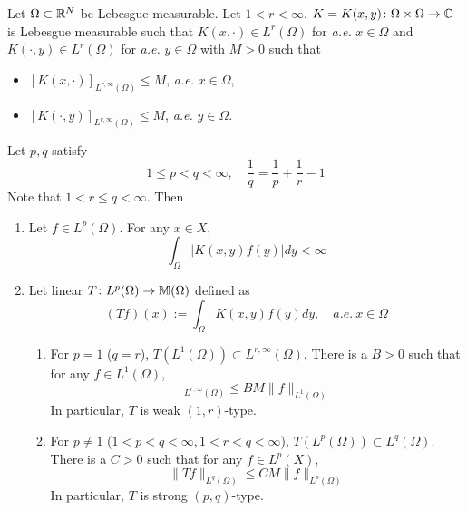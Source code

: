\begin{thm}\label{thm:weakkernel}
	Let $\Omega \subset \mathbb{R}^N$ be Lebesgue measurable. Let $1 < r < \infty$. $K = K(x,y) \colon \Omega \times \Omega \rightarrow \mathbb{C}$ is Lebesgue measurable such that $K(x,\cdot) \in L^r(\Omega)$ for \emph{a.e.} $x \in \Omega$ and $K(\cdot,y) \in L^r(\Omega)$ for \emph{a.e.} $y \in \Omega$ with $M > 0$ such that
	\begin{itemize}
		\item $[K(x, \cdot)]_{L^{r, \infty}(\Omega)} \leq M$, \emph{a.e.} $x\in \Omega$,
		\item $[K(\cdot,y)]_{L^{r, \infty}(\Omega)} \leq M$, \emph{a.e.} $y\in \Omega$.
	\end{itemize}
	Let $p,q$ satisfy
	\begin{equation*}
		1 \leq p<q<\infty, \quad \frac{1}{q}=\frac{1}{p}+\frac{1}{r}-1
	\end{equation*}
	Note that $1<r \leq q<\infty$. Then
	\begin{enumerate}[label=(\arabic{*})]
		\item Let $f \in L^p(\Omega)$. For any $x \in X$,
		\begin{equation*}
			\int_{\Omega}|K(x, y) f(y)| d y<\infty
		\end{equation*}
		\item Let linear $T \colon L^p(\Omega) \rightarrow \mathbb{M}(\Omega)$ defined as
		\begin{equation*}
			(T f)(x):=\int_{\Omega} K(x, y) f(y) d y, \quad  { a.e. }~ x \in \Omega
		\end{equation*}
		\begin{enumerate}[label=(\roman*)]
			\item For $p = 1$ ($q = r$), $T(L^1(\Omega)) \subset L^{r,\infty}(\Omega)$. There is a $B > 0$ such that for any $f \in L^1(\Omega)$,
			\begin{equation*}
				[T f]_{L^{r, \infty}(\Omega)} \leq B M\|f\|_{L^1(\Omega)}
			\end{equation*}
			In particular, $T$ is weak $(1,r)$-type.

			\item For $p \neq 1$ ($1<p<q<\infty, 1<r<q<\infty$), $T(L^p(\Omega))\subset L^q(\Omega)$. There is a $C > 0$ such that for any $f \in L^p(X)$,
			\begin{equation*}
				\|T f\|_{L^q(\Omega)} \leq C M\|f\|_{L^p(\Omega)}
			\end{equation*}
			In particular, $T$ is strong $(p,q)$-type.
		\end{enumerate}
	\end{enumerate}
\end{thm}
